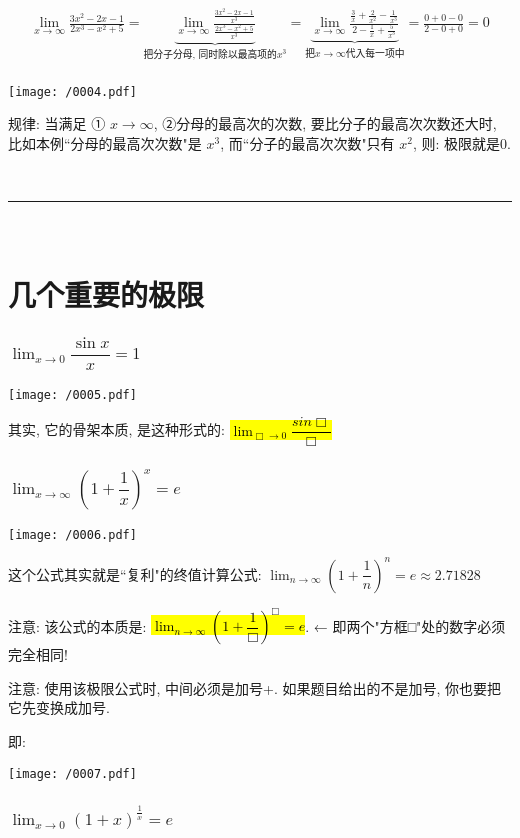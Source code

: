 \documentclass[UTF8]{ctexart}
\begin{document}
\begin{tcolorbox}[title = {例},boxrule={0.1em},colframe={black!10}, colback={black!3},colbacktitle={black!10},coltitle={black}]
	\begin{align*}  %
			\lim_{x\rightarrow \infty}\frac{3x^2-2x-1}{2x^3-x^2+5}=\underset{\text{把分子分母,\ 同时除以最高项的}x^3}{\underbrace{\lim_{x\rightarrow \infty}\frac{\frac{3x^2-2x-1}{x^3}}{\frac{2x^3-x^2+5}{x^3}}}}=\underset{\text{把}x\rightarrow \infty \text{代入每一项中}}{\underbrace{\lim_{x\rightarrow \infty}\frac{\frac{3}{x}+\frac{2}{x^2}-\frac{1}{x^3}}{2-\frac{1}{x}+\frac{5}{x^3}}}}=\frac{0+0-0}{2-0+0}=0\\
	\end{align*}

	\texttt{[image: /0004.pdf]}
	
	规律: 当满足 ① $x \rightarrow \infty$, ②分母的最高次的次数, 要比分子的最高次次数还大时, 比如本例``分母的最高次次数"是 $x^3$, 而``分子的最高次次数"只有 $x^2$, 则: 极限就是0.
\end{tcolorbox}


~\\
\hrule
~\\


\part{几个重要的极限}


\section{$ \lim_{x \to 0} \dfrac{\sin x} {x} = 1 $}

\texttt{[image: /0005.pdf]}

其实, 它的骨架本质, 是这种形式的: \hl{$\lim_{\Box \to 0} \dfrac{sin \Box} {\Box}$}






\section{$ \lim_{x \to \infty} (1+ \dfrac{1} {x})^x = e $}

\texttt{[image: /0006.pdf]}

这个公式其实就是``复利"的终值计算公式: $ \lim_{n \to \infty} (1+ \dfrac{1} {n})^n = e \approx 2.71828 $

注意: 该公式的本质是: \hl{$\lim_{n \to \infty} (1+ \dfrac{1} {\Box})^\Box = e$}.  ← 即两个"方框□"处的数字必须完全相同!

注意: 使用该极限公式时, 中间必须是加号+. 如果题目给出的不是加号, 你也要把它先变换成加号.
	
即: 

\texttt{[image: /0007.pdf]}


\section{$\lim_{x \to 0} (1+x)^{\frac{1} {x}} =e $}
\end{document}
